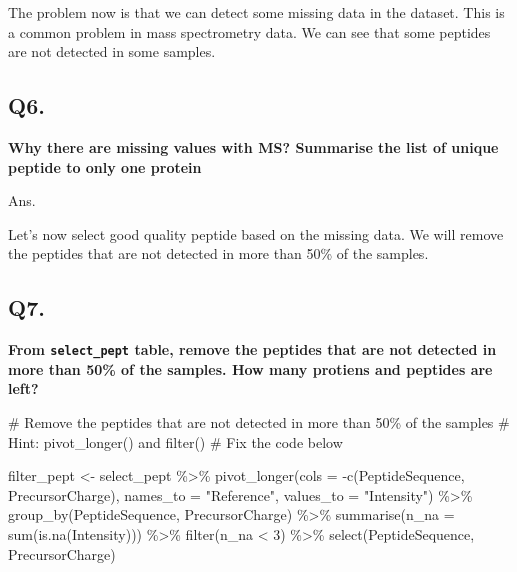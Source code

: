 \documentclass[
  letterpaper,
  DIV=11,
  numbers=noendperiod]{scrartcl}
\newenvironment{Shaded}{\begin{snugshade}}{\end{snugshade}}
\newcommand{\AttributeTok}[1]{\textcolor[rgb]{0.40,0.45,0.13}{#1}}
\newcommand{\CommentTok}[1]{\textcolor[rgb]{0.37,0.37,0.37}{#1}}
\newcommand{\DecValTok}[1]{\textcolor[rgb]{0.68,0.00,0.00}{#1}}
\newcommand{\FunctionTok}[1]{\textcolor[rgb]{0.28,0.35,0.67}{#1}}
\newcommand{\NormalTok}[1]{\textcolor[rgb]{0.00,0.23,0.31}{#1}}
\newcommand{\OtherTok}[1]{\textcolor[rgb]{0.00,0.23,0.31}{#1}}
\newcommand{\SpecialCharTok}[1]{\textcolor[rgb]{0.37,0.37,0.37}{#1}}
\newcommand{\StringTok}[1]{\textcolor[rgb]{0.13,0.47,0.30}{#1}}
\begin{document}

The problem now is that we can detect some missing data in the dataset.
This is a common problem in mass spectrometry data. We can see that some
peptides are not detected in some samples.

\subsection{Q6.}\label{q6.}

\textbf{Why there are missing values with MS? Summarise the list of
unique peptide to only one protein}

Ans.

Let's now select good quality peptide based on the missing data. We will
remove the peptides that are not detected in more than 50\% of the
samples.

\subsection{Q7.}\label{q7.}

\textbf{From \texttt{select\_pept} table, remove the peptides that are
not detected in more than 50\% of the samples. How many protiens and
peptides are left?}

\begin{Shaded}
\begin{Highlighting}[]
\CommentTok{\# Remove the peptides that are not detected in more than 50\% of the samples}
\CommentTok{\# Hint: pivot\_longer() and filter()}
\CommentTok{\# Fix the code below}

\NormalTok{filter\_pept }\OtherTok{\textless{}{-}}\NormalTok{ select\_pept }\SpecialCharTok{\%\textgreater{}\%} 
  \FunctionTok{pivot\_longer}\NormalTok{(}\AttributeTok{cols =} \SpecialCharTok{{-}}\FunctionTok{c}\NormalTok{(PeptideSequence, PrecursorCharge), }\AttributeTok{names\_to =} \StringTok{"Reference"}\NormalTok{, }\AttributeTok{values\_to =} \StringTok{"Intensity"}\NormalTok{) }\SpecialCharTok{\%\textgreater{}\%} 
  \FunctionTok{group\_by}\NormalTok{(PeptideSequence, PrecursorCharge) }\SpecialCharTok{\%\textgreater{}\%}
  \FunctionTok{summarise}\NormalTok{(}\AttributeTok{n\_na =} \FunctionTok{sum}\NormalTok{(}\FunctionTok{is.na}\NormalTok{(Intensity))) }\SpecialCharTok{\%\textgreater{}\%}
  \FunctionTok{filter}\NormalTok{(n\_na }\SpecialCharTok{\textless{}} \DecValTok{3}\NormalTok{) }\SpecialCharTok{\%\textgreater{}\%} 
  \FunctionTok{select}\NormalTok{(PeptideSequence, PrecursorCharge)}
\end{Highlighting}
\end{Shaded}
\end{document}
